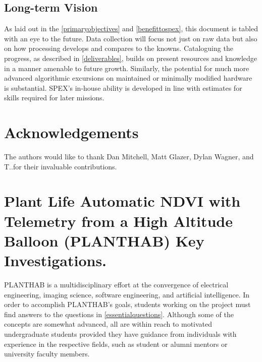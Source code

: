 \documentclass[conference]{IEEEtran} %
\begin{document}
\subsection{Long-term Vision}
As laid out in the \autoref{primaryobjectives} and \autoref{benefittospex}, this document is tabled with an eye to the future. Data collection will focus not just on raw data but also on how processing develops and compares to the knowns.
Cataloguing the progress, as described in \autoref{deliverables}, builds on present resources and knowledge in a manner amenable to future growth.
Similarly, the potential for much more advanced algorithmic excursions on maintained or minimally modified hardware is substantial.
SPEX's in-house ability is developed in line with estimates for skills required for later missions.


\section*{Acknowledgements}
The authors would like to thank Dan Mitchell, Matt Glazer, Dylan Wagner, and T.\@J.\@Tarazevits for their invaluable contributions.




\onecolumn
\appendices{}


\section{Plant Life Automatic NDVI with Telemetry from a High Altitude Balloon (PLANTHAB) Key Investigations.}
PLANTHAB is a multidisciplinary effort at the convergence of electrical engineering, imaging science, software engineering, and artificial intelligence.
In order to accomplish PLANTHAB's goals, students working on the project must find answers to the questions in \autoref{essentialquestions}.
Although some of the concepts are somewhat advanced, all are within reach to motivated undergraduate students provided they have guidance from individuals with experience in the respective fields, such as student or alumni mentors or university faculty members.
\end{document}

